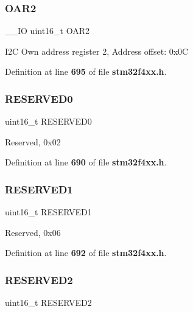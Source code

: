\subsubsection{O\+A\+R2\hspace{0.1cm}{\footnotesize\ttfamily [2/2]}}
{\footnotesize\ttfamily \+\_\+\+\_\+\+IO uint16\+\_\+t O\+A\+R2}

I2C Own address register 2, Address offset\+: 0x0C 

Definition at line \textbf{ 695} of file \textbf{ stm32f4xx.\+h}.

\mbox{\label{structI2C__TypeDef_a149feba01f9c4a49570c6d88619f504f}} 
\subsubsection{R\+E\+S\+E\+R\+V\+E\+D0}
{\footnotesize\ttfamily uint16\+\_\+t R\+E\+S\+E\+R\+V\+E\+D0}

Reserved, 0x02 

Definition at line \textbf{ 690} of file \textbf{ stm32f4xx.\+h}.

\mbox{\label{structI2C__TypeDef_a8249a3955aace28d92109b391311eb30}} 
\subsubsection{R\+E\+S\+E\+R\+V\+E\+D1}
{\footnotesize\ttfamily uint16\+\_\+t R\+E\+S\+E\+R\+V\+E\+D1}

Reserved, 0x06 

Definition at line \textbf{ 692} of file \textbf{ stm32f4xx.\+h}.

\mbox{\label{structI2C__TypeDef_a5573848497a716a9947fd87487709feb}} 
\subsubsection{R\+E\+S\+E\+R\+V\+E\+D2}
{\footnotesize\ttfamily uint16\+\_\+t R\+E\+S\+E\+R\+V\+E\+D2}

